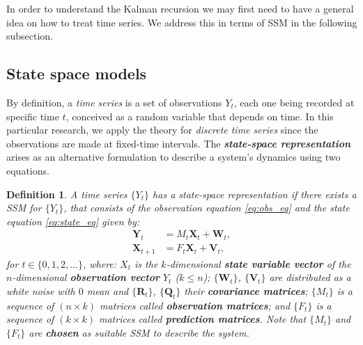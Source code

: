 \documentclass{article}
\newtheorem{definition}[theorem]{Definition}
\theoremstyle{definition}
\theoremstyle{definition}
\theoremstyle{remark}
\theoremstyle{mythmstyle}
\begin{document}
In order to understand the Kalman recursion we may first need to have a general idea on how to treat time series. We address this in terms of SSM in the following subsection. 
 
\subsection{State space models}

By definition, a \textit{time series} is a set of observations $Y_t$, each one being recorded at specific time $t$, conceived as a random variable that depends on time. In this particular research, we apply the theory for \textit{discrete time series} since the observations are made at fixed-time intervals.
The \textbf{\textit{state-space representation}} arises as an alternative formulation to describe a system's dynamics using two equations. 
 
\begin{definition}
A time series $\{Y_t\}$ has a state-space representation if there exists a SSM for $\{Y_t\}$, that consists of the observation equation \ref{eq:obs_eq} and the state equation \ref{eq:state_eq} given by:
\begin{align}
    \textbf{Y}_t &= M_t \textbf{X}_t + \textbf{W}_t, \label{eq:obs_eq}
    \\
    \textbf{X}_{t+1} &= F_t \textbf{X}_t + \textbf{V}_t, \label{eq:state_eq}
\end{align}
for $t \in \{0, 1, 2, \dots\}$,  where: $X_t$ is the $k$-dimensional \textbf{state variable vector} of the $n$-dimensional \textbf{observation vector} $Y_t$ ($k\leq n$); $\{\textbf{W}_t\}$, $\{\textbf{V}_t\}$ are distributed as a white noise with $0$ mean and $\{\textbf{R}_t\}$, $\{\textbf{Q}_t\}$ their \textbf{covariance matrices}; $\{ M_t\}$ is a sequence of $(n \times k)$ matrices called \textbf{observation matrices}; and $\{F_t\}$ is a sequence of $(k \times k)$ matrices called \textbf{prediction matrices}. Note that $\{ M_t\}$ and $\{F_t\}$ are \textbf{chosen} as suitable SSM to describe the system.
\end{definition}
\end{document}
